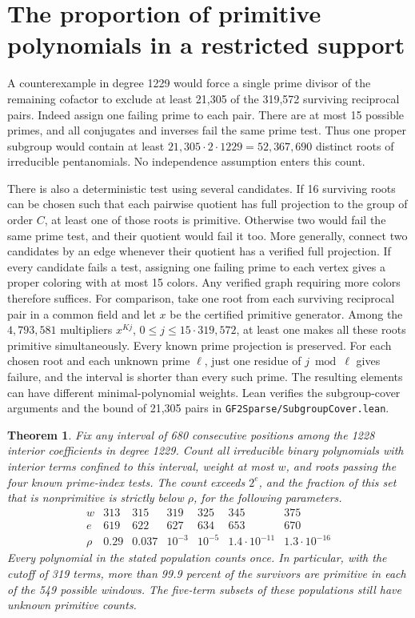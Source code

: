 \documentclass[11pt]{article}
\newtheorem{theorem}{Theorem}
\begin{document}
\section{The proportion of primitive polynomials in a restricted support}
\label{sec:window-order-density}
A counterexample in degree 1229 would force a single prime divisor of
the remaining cofactor to exclude at least 21,305 of the 319,572
surviving reciprocal pairs. Indeed assign one failing prime to each
pair. There are at most 15 possible primes, and all conjugates and
inverses fail the same prime test. Thus one proper subgroup would
contain at least \(21{,}305\cdot2\cdot1229=52{,}367{,}690\) distinct
roots of irreducible pentanomials. No independence assumption enters
this count.

There is also a deterministic test using several candidates.
If 16 surviving roots can be chosen such that each pairwise quotient
has full projection to the group of order \(C\), at least one of those
roots is primitive. Otherwise two would fail the same prime test, and
their quotient would fail it too. More generally, connect two candidates
by an edge whenever their quotient has a verified full projection. If
every candidate fails a test, assigning one failing prime to each
vertex gives a proper coloring with at most 15 colors. Any verified
graph requiring more colors therefore suffices. For comparison, take one root from
each surviving reciprocal pair in a common field and let \(x\) be
the certified primitive generator. Among the \(4{,}793{,}581\) multipliers
\(x^{Kj}\), \(0\le j\le15\cdot319{,}572\), at least one makes all
these roots primitive simultaneously. Every known prime projection is
preserved. For each chosen root and each unknown prime \(\ell\), just
one residue of \(j\bmod\ell\) gives failure, and the interval is
shorter than every such prime. The resulting elements can have
different minimal-polynomial weights. Lean verifies the subgroup-cover
arguments and the bound of 21,305 pairs in
\nolinkurl{GF2Sparse/SubgroupCover.lean}.
\begin{theorem}
Fix any interval of 680 consecutive positions among the 1228 interior
coefficients in degree 1229. Count all irreducible binary polynomials
with interior terms confined to this interval, weight at most \(w\),
and roots passing the four known prime-index tests.
The count exceeds \(2^e\), and the fraction of this set that is
nonprimitive is strictly below \(\rho\), for the following parameters.
\[
\begin{array}{c|rrrrrr}
w & 313&315&319&325&345&375\\
e & 619&622&627&634&653&670\\
\rho & 0.29 &0.037 &10^{-3} &10^{-5} &1.4\cdot10^{-11}&1.3\cdot10^{-16}
\end{array}
\]
Every polynomial in the stated population counts once. In particular,
with the cutoff of 319 terms, more than 99.9 percent of the survivors
are primitive in each of the 549 possible windows. The five-term
subsets of these populations still have unknown primitive counts.
\end{theorem}
\end{document}
